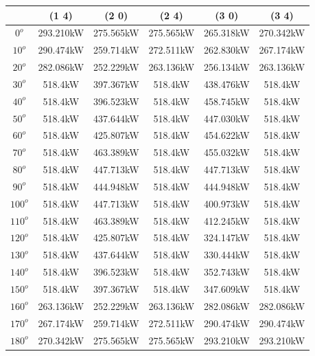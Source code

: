         \begin{table}[H]
        	\centering
        	\begin{tabular}{|c|c|c|c|c|c|} \hline
        			& (1 4)		& (2 0)		& (2 4)		& (3 0)		& (3 4)		\\ \hline
        		$0^o$	& 293.210kW	& 275.565kW	& 275.565kW	& 265.318kW	& 270.342kW	\\ \hline
        		$10^o$	& 290.474kW	& 259.714kW	& 272.511kW	& 262.830kW	& 267.174kW	\\ \hline
        		$20^o$	& 282.086kW	& 252.229kW	& 263.136kW	& 256.134kW	& 263.136kW	\\ \hline
        		$30^o$	& 518.4kW	& 397.367kW	& 518.4kW	& 438.476kW	& 518.4kW	\\ \hline
        		$40^o$	& 518.4kW	& 396.523kW	& 518.4kW	& 458.745kW	& 518.4kW	\\ \hline
        		$50^o$	& 518.4kW	& 437.644kW	& 518.4kW	& 447.030kW	& 518.4kW	\\ \hline
        		$60^o$	& 518.4kW	& 425.807kW	& 518.4kW	& 454.622kW	& 518.4kW	\\ \hline
        		$70^o$	& 518.4kW	& 463.389kW	& 518.4kW	& 455.032kW	& 518.4kW	\\ \hline
        		$80^o$	& 518.4kW	& 447.713kW	& 518.4kW	& 447.713kW	& 518.4kW	\\ \hline
        		$90^o$	& 518.4kW	& 444.948kW	& 518.4kW	& 444.948kW	& 518.4kW	\\ \hline
        		$100^o$	& 518.4kW	& 447.713kW	& 518.4kW	& 400.973kW	& 518.4kW	\\ \hline
        		$110^o$	& 518.4kW	& 463.389kW	& 518.4kW	& 412.245kW	& 518.4kW	\\ \hline
        		$120^o$	& 518.4kW	& 425.807kW	& 518.4kW	& 324.147kW	& 518.4kW	\\ \hline
        		$130^o$	& 518.4kW	& 437.644kW	& 518.4kW	& 330.444kW	& 518.4kW	\\ \hline
        		$140^o$	& 518.4kW	& 396.523kW	& 518.4kW	& 352.743kW	& 518.4kW	\\ \hline
        		$150^o$	& 518.4kW	& 397.367kW	& 518.4kW	& 347.609kW	& 518.4kW	\\ \hline
        		$160^o$	& 263.136kW	& 252.229kW	& 263.136kW	& 282.086kW	& 282.086kW	\\ \hline
        		$170^o$	& 267.174kW	& 259.714kW	& 272.511kW	& 290.474kW	& 290.474kW	\\ \hline
        		$180^o$	& 270.342kW	& 275.565kW	& 275.565kW	& 293.210kW	& 293.210kW	\\ \hline

\end{tabular}
\end{table}
